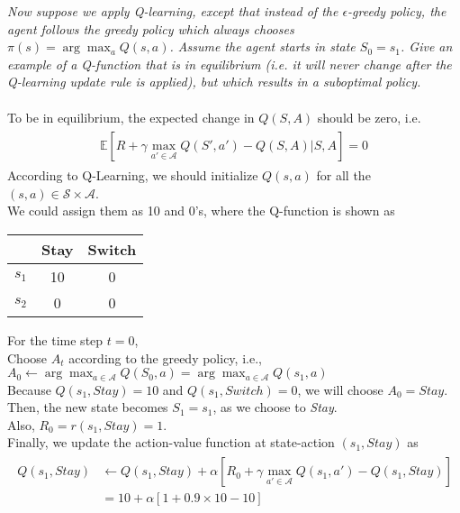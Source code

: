 \documentclass{myhw}
\begin{document}
\begin{homeworkProblem}
\begin{homeworkSection}
\end{homeworkSection}
\begin{homeworkSection}	
\emph{Now suppose we apply Q-learning, except that instead of the $\epsilon$-greedy policy, the agent follows the greedy policy which always chooses $\pi(s) = \arg \max_a Q(s,a)$. Assume the agent starts in state $S_0 = s_1$. Give an example of a Q-function that is in equilibrium (i.e. it will never change after the Q-learning update rule is applied), but which results in a suboptimal policy.} \\
\\
To be in equilibrium, the expected change in $Q(S, A)$ should be zero, i.e.
\begin{gather*}
\begin{aligned}
\mathbb{E} [R + \gamma \max_{a'\in\mathcal{A}} Q(S',a') - Q(S,A)|S,A] = 0
\end{aligned}
\end{gather*}
According to Q-Learning, we should initialize $Q(s,a)$ for all the $(s,a) \in \mathcal{S} \times \mathcal{A}$. \\
We could assign them as 10 and 0's, where the Q-function is shown as 
\begin{center}
\begin{tabular}{c|c|c}
  & Stay & Switch \\ 
 \hline
 $s_1$ & 10 & 0 \\  
 \hline
 $s_2$ & 0 & 0    
\end{tabular} 
\end{center} 
For the time step $t=0$, \\
Choose $A_t$ according to the greedy policy, i.e., 
$A_0 \leftarrow \arg\max_{a\in\mathcal{A}}Q(S_0, a)=\arg\max_{a\in\mathcal{A}}Q(s_1, a)$ \\
Because $Q(s_1,Stay)=10$ and $Q(s_1,Switch)  = 0$, we will choose $A_0 = Stay$. \\
Then, the new state becomes $S_1=s_1$, as we choose to \emph{Stay}. \\
Also, $R_0 = r(s_1,Stay)=1$. \\
Finally, we update the action-value function at state-action $(s_1,Stay)$ as 
\begin{gather*}
\begin{aligned}
Q(s_1,Stay) &\leftarrow Q(s_1,Stay) + \alpha [R_0 + \gamma \max_{a'\in\mathcal{A}}Q(s_1,a')-Q(s_1,Stay)] \\
&= 10 + \alpha [1 + 0.9 \times 10 - 10] \\

\end{aligned}
\end{gather*}
\end{homeworkSection}
\end{homeworkProblem}
\end{document}

